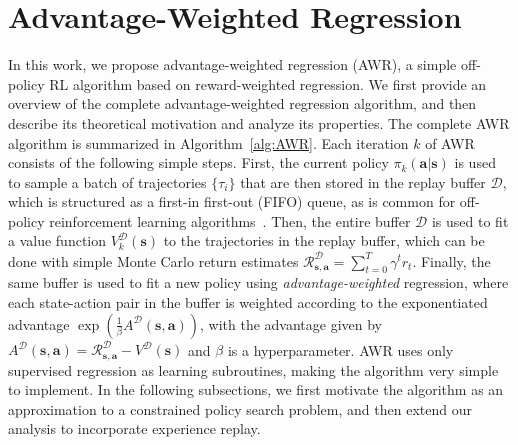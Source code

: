 \section{Advantage-Weighted Regression} In this work, we propose advantage-weighted regression (AWR), a simple off-policy RL algorithm based on reward-weighted regression. We first provide an overview of the complete advantage-weighted regression algorithm, and then describe its theoretical motivation and analyze its properties. The complete AWR algorithm is summarized in Algorithm~\ref{alg:AWR}. Each iteration $k$ of AWR consists of the following simple steps. First, the current policy $\pi_{k}({\mathbf{a}}|{\mathbf{s}})$ is used to sample a batch of trajectories $\{\tau_i\}$ that are then stored in the replay buffer $\mathcal{D}$, which is structured as a first-in first-out (FIFO) queue, as is common for off-policy reinforcement learning algorithms~\citep{mnih2015humanlevel,DDPG2016}. Then, the entire buffer $\mathcal{D}$ is used to fit a value function $V_k^{\mathcal{D}}({\mathbf{s}})$ to the trajectories in the replay buffer, which can be done with simple Monte Carlo return estimates $\mathcal{R}_{{\mathbf{s}},{\mathbf{a}}}^\mathcal{D} = \sum_{t=0}^T \gamma^t r_t$. Finally, the same buffer is used to fit a new policy using \emph{advantage-weighted} regression, where each state-action pair in the buffer is weighted according to the exponentiated advantage $\exp(\frac{1}{\beta} A^\mathcal{D}({\mathbf{s}},{\mathbf{a}}))$, with the advantage given by $A^\mathcal{D}({\mathbf{s}}, {\mathbf{a}}) = \mathcal{R}_{{\mathbf{s}},{\mathbf{a}}}^\mathcal{D} - V^{\mathcal{D}}({\mathbf{s}})$ and $\beta$ is a hyperparameter. AWR uses only supervised regression as learning subroutines, making the algorithm very simple to implement. In the following subsections, we first motivate the algorithm as an approximation to a constrained policy search problem, and then extend our analysis to incorporate experience replay.

